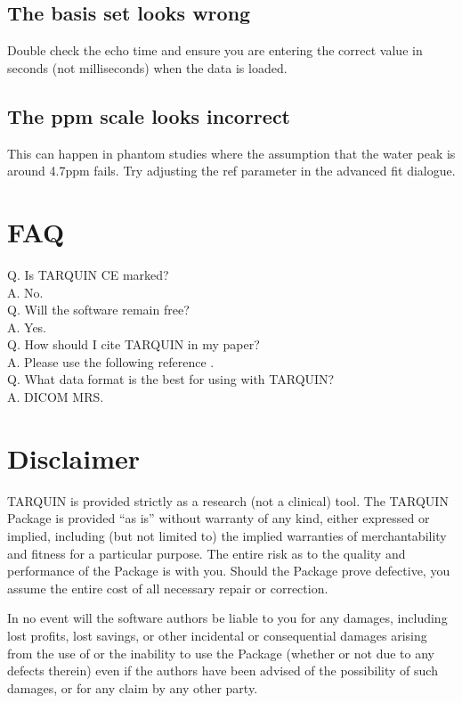 \documentclass[a4paper,12pt]{article}
\begin{document}
\subsection{The basis set looks wrong}
Double check the echo time and ensure you are entering the correct value in seconds (not milliseconds) when the data is loaded.

\subsection{The ppm scale looks incorrect}
This can happen in phantom studies where the assumption that the water peak is around 4.7ppm fails. Try adjusting the ref parameter in the advanced fit dialogue.



\section{FAQ}
Q. Is TARQUIN CE marked?\\ 
A. No. \\
Q. Will the software remain free? \\
A. Yes. \\
Q. How should I cite TARQUIN in my paper? \\
A. Please use the following reference \cite{tarquin_paper}. \\
Q. What data format is the best for using with TARQUIN? \\
A. DICOM MRS.

\section{Disclaimer}
TARQUIN is provided strictly as a research (not a clinical) tool.  The TARQUIN Package is provided ``as is'' without warranty of any kind, either expressed or implied, including (but not limited to) the implied warranties of merchantability and fitness for a particular purpose. The entire risk as to the quality and performance of the Package is with you. Should the Package prove defective, you assume the entire cost of all necessary repair or correction.

In no event will the software authors be liable to you for any damages, including lost profits, lost savings, or other incidental or consequential damages arising from the use of or the inability to use the Package (whether or not due to any defects therein) even if the authors have been advised of the possibility of such damages, or for any claim by any other party. 



\end{document}
